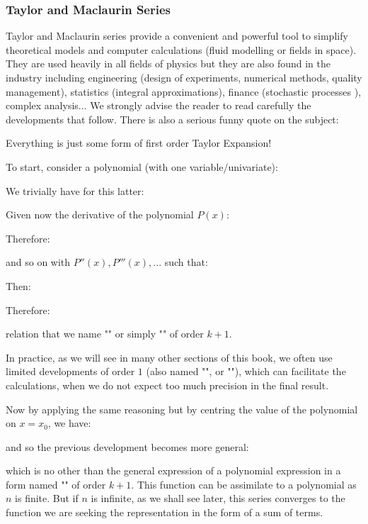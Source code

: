 	\subsubsection{Taylor and Maclaurin Series}\label{taylor series}
	Taylor and Maclaurin series provide a convenient and powerful tool to simplify theoretical models and computer calculations (fluid modelling or fields in space). They are used heavily in all fields of physics but they are also found in the industry including engineering (design of experiments, numerical methods, quality management), statistics (integral approximations), finance (stochastic processes ), complex analysis... We strongly advise the reader to read carefully the developments that follow. There is also a serious funny quote on the subject:
	\begin{fquote}Everything is just some form of first order Taylor Expansion!\end{fquote}
	To start, consider a polynomial (with one variable/univariate):
	
	We trivially have for this latter:
	
	Given now the derivative of the polynomial $P (x)$:
	
	Therefore:
	
	and so on with $P''(x), P'''(x), ...$ such that:
	
	Then:
	
	Therefore:
	
	relation that we name "" or simply "" of order $k + 1$.
	\begin{tcolorbox}[title=Remark,colframe=black,arc=10pt]
	In practice, as we will see in many other sections of this book, we often use limited developments of order $1$ (also named "", or ""), which can facilitate the calculations, when we do not expect too much precision in the final result.
	\end{tcolorbox}
	Now by applying the same reasoning but by centring the value of the polynomial on $x=x_0$, we have:
	
	and so the previous development becomes more general:
	
	which is no other than the general expression of a polynomial expression in a form named "" of order $k + 1$. This function can be assimilate to a polynomial as $n$ is finite. But if $n$ is infinite, as we shall see later, this series converges to the function we are seeking the representation in the form of a sum of terms.
	
